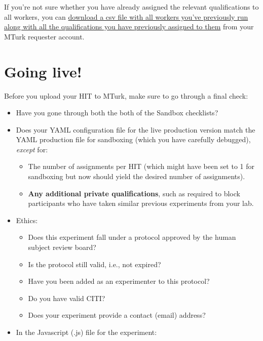 \documentclass{article}
\begin{document}
If you're not sure whether you have already assigned the relevant qualifications to all workers, you can \href{https://requester.mturk.com/workers/download?utf8=\%E2\%9C\%93&check=true}{download a csv file with all workers you've previously run along with all the qualifications you have previously assigned to them} from your MTurk requester account.

\section{Going live!}

Before you upload your HIT to MTurk, make sure to go through a final check:

\begin{tcolorbox}[colback=gray!5,colframe=blue!40!black,title=Final checklist]
\begin{itemize}
    \item Have you gone through both the both of the Sandbox checklists?
    \item Does your YAML configuration file for the live production version match the YAML production file for sandboxing (which you have carefully debugged), {\em except} for:
    \begin{itemize}
      \item The number of assignments per HIT (which might have been set to 1 for sandboxing but now should yield the desired number of assignments).
      \item \textbf{Any additional private qualifications}, such as required to block participants who have taken similar previous experiments from your lab.
    \end{itemize}
    \item Ethics:
    \begin{itemize}
        \item Does this experiment fall under a protocol approved by the human subject review board?
        \item Is the protocol still valid, i.e., not expired?
        \item Have you been added as an experimenter to this protocol?
        \item Do you have valid CITI?
        \item Does your experiment provide a contact (email) address?
    \end{itemize}
    \item In the Javascript (.js) file for the experiment:
    \begin{itemize}

\end{itemize}
\end{itemize}
\end{tcolorbox}
\end{document}
